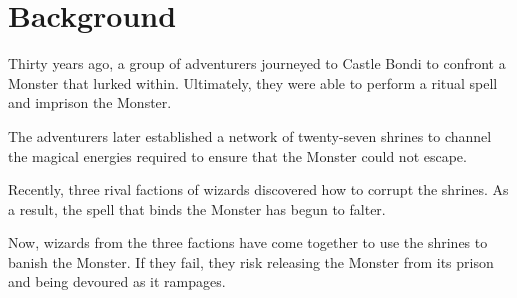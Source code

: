 \documentclass[10pt, parskip=half-, twoside]{scrartcl}
\begin{document}
{\contourlength{0.66pt}
\setmainfont[Scale=3.0]{Tex Gyre Chorus}
\center \Huge {}


\vfill
\contourlength{0.4pt}
\center \large {}
\phantom{a}
}

\newpage
{}

\section*{Background}
Thirty years ago, a group of adventurers journeyed to Castle Bondi to confront a Monster that lurked within.
Ultimately, they were able to perform a ritual spell and imprison the Monster.

The adventurers later established a network of twenty-seven shrines to channel the magical energies required to ensure that the Monster could not escape.%

Recently, three rival factions of wizards discovered how to corrupt the shrines.
As a result, the spell that binds the Monster has begun to falter.

Now, wizards from the three factions have come together to use the shrines to banish the Monster.
If they fail, they risk releasing the Monster from its prison and being devoured as it rampages.
\end{document}
